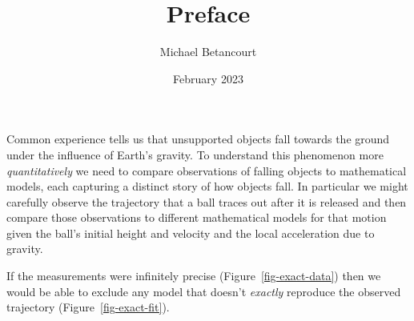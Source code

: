 \documentclass[
  letterpaper,
  DIV=11,
  numbers=noendperiod]{scrartcl}
\title{Preface}
\author{Michael Betancourt}
\date{February 2023}
\renewcommand*\contentsname{Table of contents}
\newcommand\contentsname{Table of contents}
\begin{document}
\maketitle
\ifdefined\Shaded\renewenvironment{Shaded}{\begin{tcolorbox}[borderline west={3pt}{0pt}{shadecolor}, enhanced, frame hidden, breakable, sharp corners, boxrule=0pt, interior hidden]}{\end{tcolorbox}}\fi

\renewcommand*\contentsname{Table of contents}
{
\hypersetup{linkcolor=}
\setcounter{tocdepth}{3}
\tableofcontents
}
Common experience tells us that unsupported objects fall towards the
ground under the influence of Earth's gravity. To understand this
phenomenon more \emph{quantitatively} we need to compare observations of
falling objects to mathematical models, each capturing a distinct story
of how objects fall. In particular we might carefully observe the
trajectory that a ball traces out after it is released and then compare
those observations to different mathematical models for that motion
given the ball's initial height and velocity and the local acceleration
due to gravity.

If the measurements were infinitely precise
(Figure~\ref{fig-exact-data}) then we would be able to exclude any model
that doesn't \emph{exactly} reproduce the observed trajectory
(Figure~\ref{fig-exact-fit}).
\end{document}
